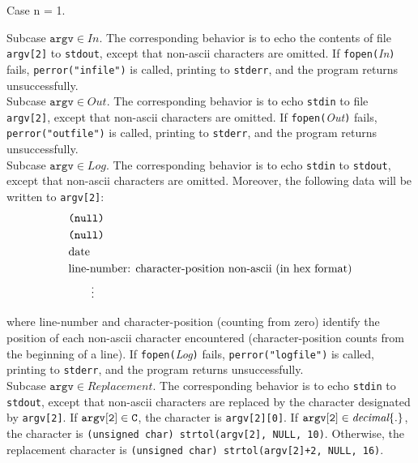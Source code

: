 \documentclass[12pt]{article}
\newcommand{\tab}{\hspace*{2em}}
\newcommand{\as}[1] {\begin{align*}#1\end{align*}}
\begin{document}
Case n = 1.

Subcase $\texttt{argv} \in In$. 
    The corresponding behavior is to echo the contents of file \texttt{argv[2]} to \texttt{stdout}, 
        except that non-ascii characters are omitted.
    If \texttt{fopen(}\textit{In}\texttt{)} fails, \texttt{perror("infile")} is called,
        printing to \texttt{stderr}, and the program returns unsuccessfully. \\

Subcase $\texttt{argv} \in Out$. 
    The corresponding behavior is to echo \texttt{stdin} to file \texttt{argv[2]}, 
        except that non-ascii characters are omitted. 
    If \texttt{fopen(}\textit{Out}\texttt{)} fails, \texttt{perror("outfile")} is called, 
        printing to \texttt{stderr}, and the program returns unsuccessfully. \\

Subcase $\texttt{argv} \in Log$. 
    The corresponding behavior is to echo \texttt{stdin} to \texttt{stdout}, except that
        non-ascii characters are omitted. Moreover, the following data will be written to \texttt{argv[2]}:
        \as{
            &\text{\texttt{(null)}} \\
            &\text{\texttt{(null)}} \\
            &\text{date} \\
            &\text{line-number: character-position non-ascii (in hex format)} \\
            &\tab \vdots
        }

        where line-number and character-position (counting from zero) identify the position of each
        non-ascii character encountered (character-position counts from the beginning of a line). 
    If \texttt{fopen(}\textit{Log}\texttt{)} fails, \texttt{perror("logfile")} is called, 
        printing to \texttt{stderr}, and the program returns unsuccessfully. \\

Subcase $\texttt{argv} \in Replacement$. The corresponding behavior is to echo \texttt{stdin} to \texttt{stdout},
except that non-ascii characters are replaced by the character designated by \texttt{argv[2]}. 
If $\tt{argv[2]} \in C$, the character is \texttt{argv[2][0]}. 
If $\tt{argv[2]} \in \textit{decimal} \{.\}$, the character is \texttt{(unsigned char) strtol(argv[2], NULL, 10)}. 
Otherwise, the replacement character is \texttt{(unsigned char) strtol(argv[2]+2, NULL, 16)}. \\
\end{document}
